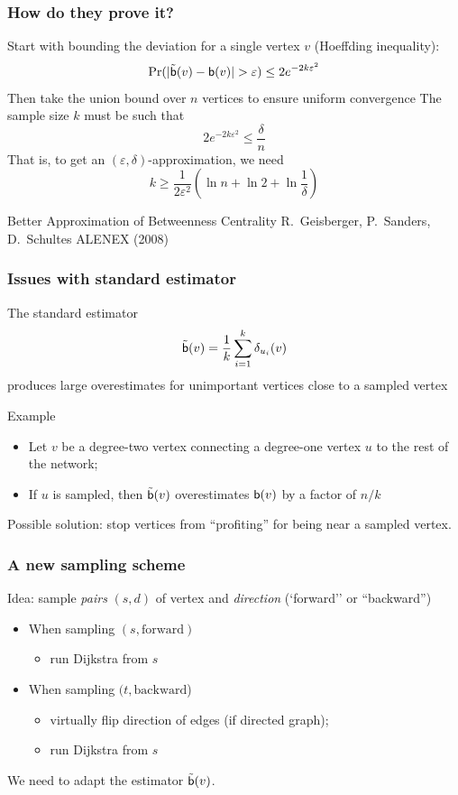 \begin{frame}
  \frametitle{How do they prove it?}
  Start with bounding the deviation for a single vertex $v$ (Hoeffding inequality):
  \[
    \Pr(|\tilde{\betw}(v)-\betw(v)|>\varepsilon)\le 2e^{-2k\varepsilon^2}
  \]
  \vfill
  Then take the union bound over $n$ vertices to ensure uniform convergence
  \vfill
  The sample size $k$ must be such that
  \[
    2e^{-2k\varepsilon^2}\le\frac{\delta}{n}
  \]
  That is, to get an $(\varepsilon,\delta)$-approximation, we need
  \[
    k\ge\frac{1}{2\varepsilon^2}\left(\ln n + \ln 2 +
    \ln\frac{1}{\delta}\right)
  \]
\end{frame}

\begin{frame}
  \centering
  \vfill
  {\huge Better Approximation of Betweenness Centrality}
  \vfill
  {\Large R.~Geisberger, P.~Sanders, D.~Schultes}
  \vfill
  {\large ALENEX (2008)}
  \vfill
\end{frame}

\begin{frame}
  \frametitle{Issues with standard estimator}
    The standard estimator
    \[
      \tilde{\mathsf{b}}(v)=\frac{1}{k}\sum_{i=1}^k \delta_{u_i}(v)
    \]
    produces large overestimates for unimportant vertices close to a sampled
    vertex
  \pause
  \begin{block}{Example}
    \begin{itemize}
      \item Let $v$ be a degree-two vertex connecting a degree-one vertex $u$ to
        the rest of the network;
      \item If $u$ is sampled, then $\tilde{\mathsf{b}}(v)$ overestimates $\mathsf{b}(v)$ by a
        factor of $n/k$
    \end{itemize}
  \end{block}
  \pause
  Possible solution: stop vertices from ``profiting'' for being near a sampled
  vertex.
\end{frame}

\begin{frame}
  \frametitle{A new sampling scheme}
  Idea: sample \emph{pairs} $(s,d)$ of vertex and \emph{direction} (`forward'' or
  ``backward'')
  \pause
  \begin{itemize}
    \item When sampling $(s,\text{forward})$
      \begin{itemize}
        \item run Dijkstra from $s$
      \end{itemize}
      \pause
    \item When sampling $(t,\text{backward}$)
      \begin{itemize}
        \item virtually flip direction of edges (if directed graph);
        \item run Dijkstra from $s$
      \end{itemize}
  \end{itemize}
  \pause
  We need to adapt the estimator $\tilde{\mathsf{b}}(v)$.
\end{frame}

